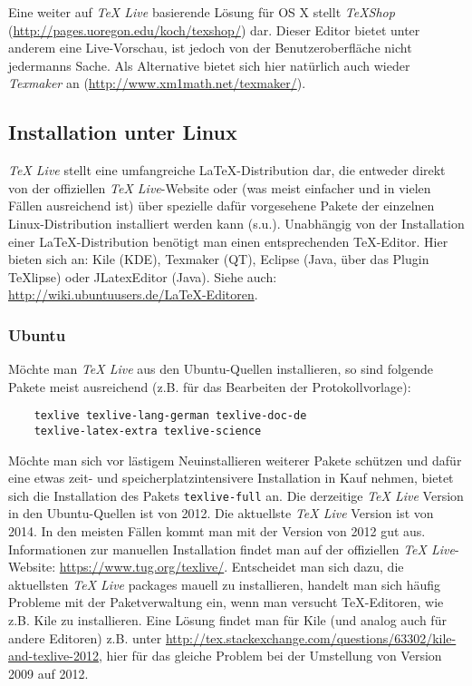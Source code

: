 Eine weiter auf \textit{TeX Live} basierende Lösung für OS X stellt \textit{TeXShop} (\url{http://pages.uoregon.edu/koch/texshop/}) dar. Dieser Editor bietet unter anderem eine Live-Vorschau, ist jedoch von der Benutzeroberfläche nicht jedermanns Sache. 
Als Alternative bietet sich hier natürlich auch wieder \textit{Texmaker} an (\url{http://www.xm1math.net/texmaker/}).

\subsection{Installation unter Linux}
\textit{TeX Live} stellt eine umfangreiche LaTeX-Distribution dar, die entweder direkt von der offiziellen \textit{TeX Live}-Website oder (was meist einfacher und in vielen Fällen ausreichend ist) über spezielle dafür vorgesehene Pakete der einzelnen Linux-Distribution installiert werden kann (s.u.). Unabhängig von der Installation einer LaTeX-Distribution benötigt man einen entsprechenden TeX-Editor. Hier bieten sich an: Kile (KDE), Texmaker (QT), Eclipse (Java, über das Plugin TeXlipse) oder JLatexEditor (Java). Siehe auch: \url{http://wiki.ubuntuusers.de/LaTeX-Editoren}.

\subsubsection{Ubuntu}
Möchte man \textit{TeX Live} aus den Ubuntu-Quellen installieren, so sind folgende Pakete meist ausreichend (z.B. für das Bearbeiten der Protokollvorlage):
\begin{verbatim}
	texlive texlive-lang-german texlive-doc-de
	texlive-latex-extra texlive-science
\end{verbatim}
Möchte man sich vor lästigem Neuinstallieren weiterer Pakete schützen und dafür eine etwas zeit- und speicherplatzintensivere Installation in Kauf nehmen, bietet sich die Installation des Pakets \verb|texlive-full| an. Die derzeitige \textit{TeX Live} Version in den Ubuntu-Quellen ist von 2012. Die aktuellste \textit{TeX Live} Version ist von 2014. In den meisten Fällen kommt man mit der Version von 2012 gut aus. Informationen zur manuellen Installation findet man auf der offiziellen \textit{TeX Live}-Website: \url{https://www.tug.org/texlive/}. Entscheidet man sich dazu, die aktuellsten \textit{TeX Live} packages mauell zu installieren, handelt man sich häufig Probleme mit der Paketverwaltung ein, wenn man versucht TeX-Editoren, wie z.B. Kile zu installieren. Eine Lösung findet man für Kile (und analog auch für andere Editoren) z.B. unter \url{http://tex.stackexchange.com/questions/63302/kile-and-texlive-2012}, hier für das gleiche Problem bei der Umstellung von Version 2009 auf 2012.

